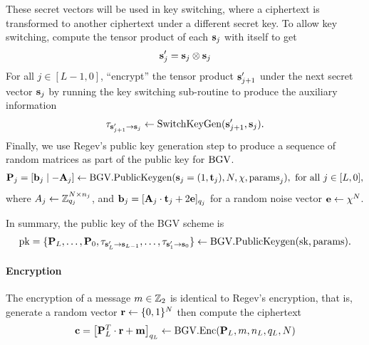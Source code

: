 \documentclass[../main.tex]{subfiles}
\begin{document}
These secret vectors will be used in key switching, where a ciphertext is transformed to another ciphertext under a different secret key. 
To allow key switching, compute the tensor product of each $\mathbf{s}_j$ with itself to get 
\begin{align*}
    \vc{s}_j' = \vc{s}_j \otimes \vc{s}_j %
\end{align*}
For all $j\in [L-1,0]$, ``encrypt'' the tensor product $\mathbf{s}_{j+1}'$ under the next secret vector $\mathbf{s}_j$ by running the key switching sub-routine to produce the auxiliary information
\begin{align*}
    \tau_{\mathbf{s}_{j+1}'\rightarrow \mathbf{s}_j} \leftarrow \text{SwitchKeyGen}(\mathbf{s}_{j+1}', \mathbf{s}_j).
\end{align*}
Finally, we use Regev's %
public key generation step to produce a sequence of random matrices as part of the public key for $\text{BGV}$. %
\begin{align*}
    \mathbf{P}_j = [\mathbf{b}_j \mid -\mathbf{A}_j] \leftarrow \text{BGV}.\text{PublicKeygen}(\mathbf{s}_j=(1,\mathbf{t}_j), N, \chi,\text{params}_j), \text{ for all } j \in [L,0],
\end{align*}
where $A_j \leftarrow \mathbb{Z}_{q_j}^{N\times n_j}$, and $\mathbf{b}_j = [\mathbf{A}_j \cdot \mathbf{t}_j + 2\mathbf{e}]_{q_j}$ for a random noise vector $\mathbf{e} \leftarrow \chi^N$.

In summary, the public key of the BGV scheme is  
\begin{align*}
    \text{pk} = \{\mathbf{P}_L,\dots, \mathbf{P}_0, \tau_{\mathbf{s}'_{L} \rightarrow \mathbf{s}_{L-1}}, \dots, \tau_{\mathbf{s}_{1}' \rightarrow \mathbf{s}_0}\} \leftarrow \text{BGV}.\text{PublicKeygen}(\text{sk}, \text{params}).
\end{align*}


\paragraph{Encryption} The encryption of a message $m\in \mathbb{Z}_2$ is identical to Regev's encryption, that is, generate a random vector $\mathbf{r} \leftarrow \{0,1\}^{N}$ then compute the ciphertext 
\begin{align*}
    \vc{c} =\sqbracket{\vc{P}_L^T \cdot \vc{r} + \vc{m}}_{q_L} \leftarrow \bgv.\enc(\vc{P}_L,m,n_L,q_L,N) %
\end{align*}
\end{document}
